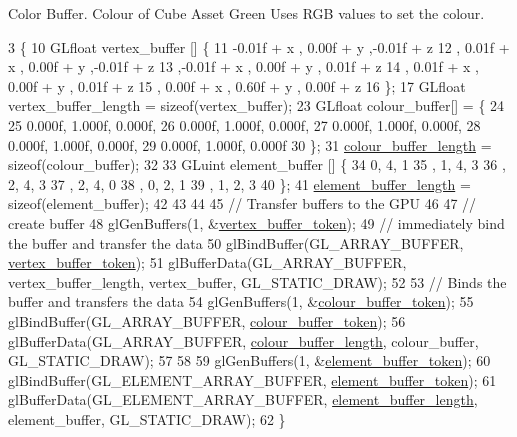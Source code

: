 Color Buffer. Colour of Cube Asset Green Uses R\+G\+B values to set the colour.
\begin{DoxyCode}
3                                                       \{
10   GLfloat vertex\_buffer [] \{
11       -0.01f + x  , 0.00f + y   ,-0.01f + z
12      , 0.01f + x  , 0.00f + y   ,-0.01f + z
13      ,-0.01f + x  , 0.00f + y   , 0.01f + z
14      , 0.01f + x  , 0.00f + y   , 0.01f + z
15      , 0.00f + x  , 0.60f + y   , 0.00f + z
16   \};
17   GLfloat vertex\_buffer\_length = \textcolor{keyword}{sizeof}(vertex\_buffer);
23   GLfloat colour\_buffer[] = \{
24 
25      0.000f, 1.000f, 0.000f,
26      0.000f, 1.000f, 0.000f,
27      0.000f, 1.000f, 0.000f,
28      0.000f, 1.000f, 0.000f,
29      0.000f, 1.000f, 0.000f
30   \};
31  \hyperlink{classGrassAsset_aede615b26df4a5624f262a10bc000d92}{colour\_buffer\_length} = \textcolor{keyword}{sizeof}(colour\_buffer);
32   
33   GLuint element\_buffer []  \{
34       0, 4, 1   
35     , 1, 4, 3
36     , 2, 4, 3   
37     , 2, 4, 0
38     , 0, 2, 1
39     , 1, 2, 3
40   \};
41   \hyperlink{classGrassAsset_a3bb3e3d9ac2d7806f0c8d2c04559e4c9}{element\_buffer\_length} = \textcolor{keyword}{sizeof}(element\_buffer);
42 
43 
44 
45   \textcolor{comment}{// Transfer buffers to the GPU}
46 
47   \textcolor{comment}{// create buffer}
48   glGenBuffers(1, &\hyperlink{classGrassAsset_a7b98229bcd980cddf4435518c254322e}{vertex\_buffer\_token});
49   \textcolor{comment}{// immediately bind the buffer and transfer the data}
50   glBindBuffer(GL\_ARRAY\_BUFFER, \hyperlink{classGrassAsset_a7b98229bcd980cddf4435518c254322e}{vertex\_buffer\_token});
51   glBufferData(GL\_ARRAY\_BUFFER, vertex\_buffer\_length, vertex\_buffer, GL\_STATIC\_DRAW);
52 
53   \textcolor{comment}{// Binds the buffer and transfers the data}
54   glGenBuffers(1, &\hyperlink{classGrassAsset_a96a3d9c956d29cd63308c7a97f6ac3bf}{colour\_buffer\_token});
55   glBindBuffer(GL\_ARRAY\_BUFFER, \hyperlink{classGrassAsset_a96a3d9c956d29cd63308c7a97f6ac3bf}{colour\_buffer\_token});
56   glBufferData(GL\_ARRAY\_BUFFER, \hyperlink{classGrassAsset_aede615b26df4a5624f262a10bc000d92}{colour\_buffer\_length}, colour\_buffer, GL\_STATIC\_DRAW);
57 
58 
59   glGenBuffers(1, &\hyperlink{classGrassAsset_accd7a1c61ad5a5c29f9e8abf653e86a8}{element\_buffer\_token});
60   glBindBuffer(GL\_ELEMENT\_ARRAY\_BUFFER, \hyperlink{classGrassAsset_accd7a1c61ad5a5c29f9e8abf653e86a8}{element\_buffer\_token});
61   glBufferData(GL\_ELEMENT\_ARRAY\_BUFFER, \hyperlink{classGrassAsset_a3bb3e3d9ac2d7806f0c8d2c04559e4c9}{element\_buffer\_length}, element\_buffer, 
      GL\_STATIC\_DRAW);
62 \}
\end{DoxyCode}
\hypertarget{classGrassAsset_a07e2206bacd2ec120f27f20e5df635b7}{}
